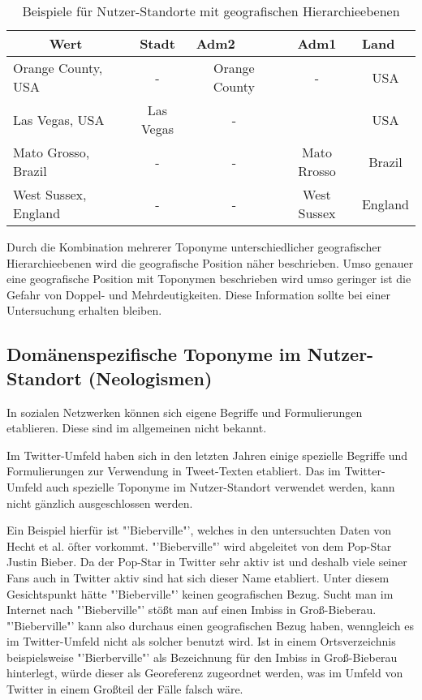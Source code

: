 			\begin{table}[h]
			\centering
			\caption{Beispiele für Nutzer-Standorte mit geografischen Hierarchieebenen}
			\label{tab:geografischeHierarchie}
			\begin{tabular}{|l|c|c|c|c|}
			\hline
			\multicolumn{1}{|c|}{Wert} & Stadt       & \multicolumn{1}{l|}{Adm2} & Adm1 & \multicolumn{1}{l|}{Land} \\ \hline
			Orange County, USA 		   & - 			 & Orange County										 & - 							   & USA    					\\ \hline
			Las Vegas, USA 		       & Las Vegas   & - 												     &								   & USA 					    \\ \hline
			Mato Grosso, Brazil        & -           & -                                                     & Mato Rrosso                     & Brazil                    \\ \hline
			West Sussex, England       & -           & -                                                     & West Sussex                     & England                   \\ \hline
			\end{tabular}
			\end{table}
 
			Durch die Kombination mehrerer Toponyme unterschiedlicher geografischer Hierarchieebenen wird die geografische Position näher beschrieben.
			Umso genauer eine geografische Position mit Toponymen beschrieben wird umso geringer ist die Gefahr von Doppel- und Mehrdeutigkeiten.  
			Diese Information sollte bei einer Untersuchung erhalten bleiben.
			
		\subsection{Domänenspezifische Toponyme im Nutzer-Standort (Neologismen)} \label{sub:domaenenspezBezug} 

			In sozialen Netzwerken können sich eigene Begriffe und Formulierungen etablieren. 
			Diese sind im allgemeinen nicht bekannt.


			Im Twitter-Umfeld haben sich in den letzten Jahren einige spezielle Begriffe und Formulierungen zur Verwendung in Tweet-Texten etabliert. 
			Das im Twitter-Umfeld auch spezielle Toponyme im Nutzer-Standort verwendet werden, kann nicht gänzlich ausgeschlossen werden. 

			Ein Beispiel hierfür ist "'Bieberville"', welches in den untersuchten Daten von Hecht et al. öfter vorkommt.
			"'Bieberville"' wird abgeleitet von dem Pop-Star Justin Bieber.	
			Da der Pop-Star in Twitter sehr aktiv ist und deshalb viele seiner Fans auch in Twitter aktiv sind hat sich dieser Name etabliert.
			Unter diesem Gesichtspunkt hätte "'Bieberville"' keinen geografischen Bezug.
			Sucht man im Internet nach "'Bieberville"' stößt man auf einen Imbiss in Groß-Bieberau.
			"'Bieberville"' kann also durchaus einen geografischen Bezug haben, wenngleich es im Twitter-Umfeld nicht als solcher benutzt wird. 
			Ist in einem Ortsverzeichnis beispielsweise "'Bierberville"' als Bezeichnung für den Imbiss in Groß-Bieberau hinterlegt, würde dieser als Georeferenz zugeordnet werden, was im Umfeld von Twitter in einem Großteil der Fälle falsch wäre.

